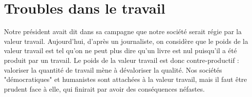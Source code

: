 \documentclass[a4paper,12pt]{book}
\begin{document}
\section{Troubles dans le travail}
Notre président avait dit dans sa campagne que notre société serait régie par la valeur travail. Aujourd'hui, d'après un journaliste, on considère que le poids de la valeur travail est tel qu'on ne peut plus dire qu'un livre est nul puisqu'il a été produit par un travail. Le poids de la valeur travail est donc contre-productif : valoriser la quantité de travail mène à dévaloriser la qualité. Nos sociétés "démocratiques" et humanistes sont attachées à la valeur travail,  mais il faut être prudent face à elle, qui finirait par avoir des conséquences néfastes. 
\end{document}
